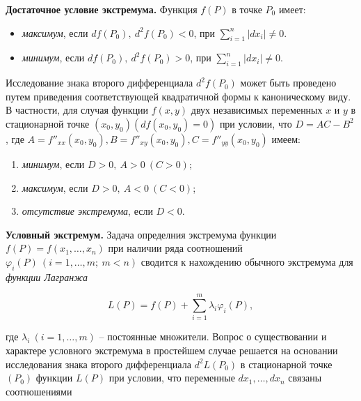         \textbf{Достаточное условие экстремума.} Функция $f \left( P \right)$ в точке $P_{0}$ имеет:

        \begin{itemize}
            \item \textit{максимум}, если $d f \left( P_{0} \right), \: d^{2} f \left( P_{0} \right) < 0$, при $\sum^{n}_{i = 1} \left| d x_{i} \right| \neq 0$.
            \item \textit{минимум}, если $d f \left( P_{0} \right), \: d^{2} f \left( P_{0} \right) > 0$, при $\sum^{n}_{i = 1} \left| d x_{i} \right| \neq 0$.
        \end{itemize}

        Исследование знака второго дифференциала $d^{2} f \left( P_{0} \right)$ может быть проведено путем приведения соответствующей квадратичной формы к каноническому виду.\\

        В частности, для случая функции $f \left( x, y \right)$ двух независимых переменных $x$ и $y$ в стационарной точке $\left( x_{0}, y_{0} \right) \left( d f \left( x_{0}, y_{0} \right) =0 \right)$ при условии, что $D = A C - B^{2}$, где $A = f''_{xx} \left( x_{0}, y_{0} \right), B = f''_{xy} \left( x_{0}, y_{0} \right), C = f''_{yy} \left( x_{0}, y_{0} \right)$ имеем:

        \begin{enumerate}
            \item \textit{минимум}, если $D > 0, \: A > 0 \: \left( C > 0 \right)$;
            \item \textit{максимум}, если $D > 0, \: A < 0 \: \left( C < 0 \right)$;
            \item \textit{отсутствие экстремума}, если $D < 0$.
        \end{enumerate}

        \textbf{Условный экстремум.} Задача определния экстремума функции $f \left( P \right) = f \left( x_{1}, \ldots, x_{n} \right)$ при наличии ряда соотношений $\varphi_{i} \left( P \right) \: \left( i = 1, \ldots, m; \: m < n \right)$ сводится к нахождению обычного экстремума для \textit{функции Лагранжа}

        \[
            L \left( P \right) = f \left( P \right) + \sum^{m}_{i = 1} \lambda_{i} \varphi_{i} \left( P \right),
        \]

        где $\lambda_{i} \: \left( i = 1, \ldots, m \right)$ -- постоянные множители. Вопрос о существовании и характере условного экстремума в простейшем случае решается на основании исследования знака второго дифференциала $d^{2} L \left( P_{0} \right)$ в стационарной точке $\left( P_{0} \right)$ функции $L \left( P \right)$ при условии, что переменные $d x_{1}, \ldots, d x_{n}$ связаны соотношениями

